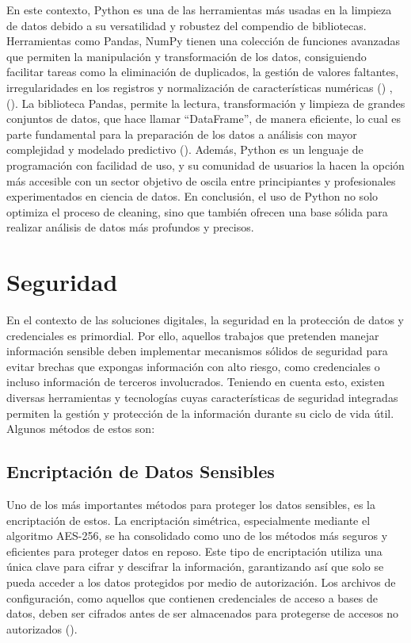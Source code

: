 \documentclass[letter,oneside,12pt,spanish]{report}
\begin{document}
\noindent En este contexto, Python es una de las herramientas más usadas en la limpieza de datos debido a su versatilidad y robustez del compendio de bibliotecas. Herramientas como Pandas, NumPy tienen una colección de funciones avanzadas que permiten la manipulación y transformación de los datos, consiguiendo facilitar tareas como la eliminación de duplicados, la gestión de valores faltantes, irregularidades en los registros y normalización de características numéricas (\cite{vanderAalst2018rpa}) , (\cite{jafari2024datapreprocessing}). La biblioteca Pandas, permite la lectura, transformación y limpieza de grandes conjuntos de datos, que hace llamar “DataFrame”, de manera eficiente, lo cual es parte fundamental para la preparación de los datos a análisis con mayor complejidad y modelado predictivo (\cite{provost2013datascience}). Además, Python es un lenguaje de programación con facilidad de uso, y su comunidad de usuarios la hacen la opción más accesible con un sector objetivo de oscila entre principiantes y profesionales experimentados en ciencia de datos. En conclusión, el uso de Python no solo optimiza el proceso de cleaning, sino que también ofrecen una base sólida para realizar análisis de datos más profundos y precisos. 


\section{Seguridad}

\noindent En el contexto de las soluciones digitales, la seguridad en la protección de datos y credenciales es primordial. Por ello, aquellos trabajos que pretenden manejar información sensible deben implementar mecanismos sólidos de seguridad para evitar brechas que expongas información con alto riesgo, como credenciales o incluso información de terceros involucrados. Teniendo en cuenta esto, existen diversas herramientas y tecnologías cuyas características de seguridad integradas permiten la gestión y protección de la información durante su ciclo de vida útil. Algunos métodos de estos son:

\subsection{Encriptación de Datos Sensibles}

\noindent Uno de los más importantes métodos para proteger los datos sensibles, es la encriptación de estos. La encriptación simétrica, especialmente mediante el algoritmo AES-256, se ha consolidado como uno de los métodos más seguros y eficientes para proteger datos en reposo. Este tipo de encriptación utiliza una única clave para cifrar y descifrar la información, garantizando así que solo se pueda acceder a los datos protegidos por medio de autorización. Los archivos de configuración, como aquellos que contienen credenciales de acceso a bases de datos, deben ser cifrados antes de ser almacenados para protegerse de accesos no autorizados (\cite{cryptography2024fernet}).
\end{document}
